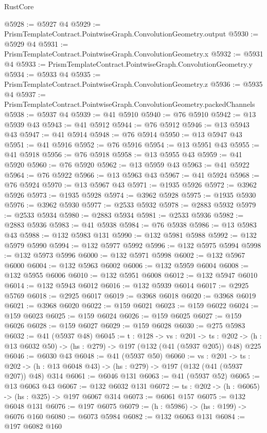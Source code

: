 \begin{lexlean}{RustCore}
\begin{coremodule}
@5928 := @5927 @4
@5929 := PrismTemplateContract.PointwiseGraph.ConvolutionGeometry.output
@5930 := @5929 @4
@5931 := PrismTemplateContract.PointwiseGraph.ConvolutionGeometry.x
@5932 := @5931 @4
@5933 := PrismTemplateContract.PointwiseGraph.ConvolutionGeometry.y
@5934 := @5933 @4
@5935 := PrismTemplateContract.PointwiseGraph.ConvolutionGeometry.z
@5936 := @5935 @4
@5937 := PrismTemplateContract.PointwiseGraph.ConvolutionGeometry.packedChannels
@5938 := @5937 @4
@5939 := @41 @5910
@5940 := @76 @5910
@5942 := @13 @5939 @43
@5943 := @41 @5912
@5944 := @76 @5912
@5946 := @13 @5943 @43
@5947 := @41 @5914
@5948 := @76 @5914
@5950 := @13 @5947 @43
@5951 := @41 @5916
@5952 := @76 @5916
@5954 := @13 @5951 @43
@5955 := @41 @5918
@5956 := @76 @5918
@5958 := @13 @5955 @43
@5959 := @41 @5920
@5960 := @76 @5920
@5962 := @13 @5959 @43
@5963 := @41 @5922
@5964 := @76 @5922
@5966 := @13 @5963 @43
@5967 := @41 @5924
@5968 := @76 @5924
@5970 := @13 @5967 @43
@5971 := @1935 @5926
@5972 := @3962 @5926
@5973 := @1935 @5928
@5974 := @3962 @5928
@5975 := @1935 @5930
@5976 := @3962 @5930
@5977 := @2533 @5932
@5978 := @2883 @5932
@5979 := @2533 @5934
@5980 := @2883 @5934
@5981 := @2533 @5936
@5982 := @2883 @5936
@5983 := @41 @5938
@5984 := @76 @5938
@5986 := @13 @5983 @43
@5988 := @132 @5983 @131
@5990 := @132 @5981 @5988
@5992 := @132 @5979 @5990
@5994 := @132 @5977 @5992
@5996 := @132 @5975 @5994
@5998 := @132 @5973 @5996
@6000 := @132 @5971 @5998
@6002 := @132 @5967 @6000
@6004 := @132 @5963 @6002
@6006 := @132 @5959 @6004
@6008 := @132 @5955 @6006
@6010 := @132 @5951 @6008
@6012 := @132 @5947 @6010
@6014 := @132 @5943 @6012
@6016 := @132 @5939 @6014
@6017 := @2925 @5769
@6018 := @2925 @6017
@6019 := @3968 @6018
@6020 := @3968 @6019
@6021 := @3968 @6020
@6022 := @159 @6021
@6023 := @159 @6022
@6024 := @159 @6023
@6025 := @159 @6024
@6026 := @159 @6025
@6027 := @159 @6026
@6028 := @159 @6027
@6029 := @159 @6028
@6030 := @275 @5983
@6032 := @41 (@5937 @48)
@6045 := {t : @128} ->
  {vs : @201} ->
  {ts : @202} -> (h : @13 @6032 @50) -> (hs : @279) -> @197 (@132 (@41 (@5937 @205)) @48) @225
@6046 := @6030 @43
@6048 := @41 (@5937 @50)
@6060 := {vs : @201} ->
  {ts : @202} -> (h : @13 @6048 @43) -> (hs : @279) -> @197 (@132 (@41 (@5937 @207)) @48) @314
@6061 := @6046 @131
@6063 := @41 (@5937 @52)
@6065 := @13 @6063 @43
@6067 := @132 @6032 @131
@6072 := {ts : @202} -> (h : @6065) -> (hs : @325) -> @197 @6067 @314
@6073 := @6061 @157
@6075 := @132 @6048 @131
@6076 := @197 @6075
@6079 := (h : @5986) -> (hs : @199) -> @6076 @160
@6080 := @6073 @5984
@6082 := @132 @6063 @131
@6084 := @197 @6082 @160

\end{coremodule}
\end{lexlean}
